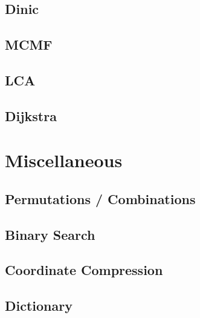 \documentclass[10pt,landscape,a4paper,twocolumn]{article}
\begin{document}
\subsection{Dinic}


\subsection{MCMF}


\subsection{LCA}


\subsection{Dijkstra}


\section{Miscellaneous}
\subsection{Permutations / Combinations}


\subsection{Binary Search}


\subsection{Coordinate Compression}


\subsection{Dictionary}

\end{document}
